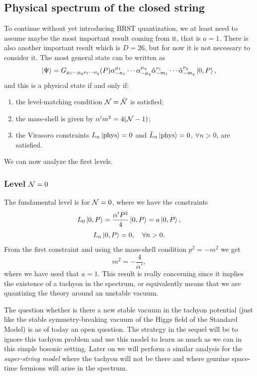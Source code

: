 \subsection{Physical spectrum of the closed string}
To continue without yet introducing BRST quantization, we at least need to assume maybe the most important result coming from it, that is $a = 1$. There is also another important result which is $D = 26$, but for now it is not necessary to consider it. The most general state can be written as 
\begin{equation}
    \ket{\Psi} = G_{\mu_1\cdots\mu_q\nu_1\cdots\nu_q}(P)\alpha^{\mu_1}_{-n_1}\cdots\alpha^{\mu_q}_{-\mu_q}\tilde{\alpha}^{\nu_1}_{-m_1}\cdots\tilde{\alpha}^{\nu_q}_{-m_q}\ket{0,P},
\end{equation}
and this is a physical state if and only if:
\begin{enumerate}
    \item the level-matching condition $\mathcal{N} = \tilde{\mathcal{N}}$ is satisfied;
    \item the mass-shell is given by $\alpha'm^2 = 4(\mathcal{N} - 1)$;
    \item the Virasoro constraints $L_n\ket{\mathrm{phys}} = 0$ and $\tilde{L}_n\ket{\mathrm{phys}} = 0$, $\forall n > 0$, are satisfied.
\end{enumerate}
We can now analyze the first levels. 

\subsubsection{Level \texorpdfstring{$\mathcal{N} = 0$}{N = 0}}
The fundamental level is for $\mathcal{N} = 0$, where we have the constraints 
\begin{equation}
    L_0\ket{0,P} = \frac{\alpha'P^2}{4}\ket{0,P} = a\ket{0,P},
\end{equation}
\begin{equation}
    L_n\ket{0,P} = 0,\quad \forall n > 0.
\end{equation}
From the first constraint and using the mass-shell condition $p^2 = -m^2$ we get 
\begin{equation}
    m^2 = -\frac{4}{\alpha'},
\end{equation}
where we have used that $a = 1$. This result is really concerning since it implies the existence of a tachyon in the spectrum, or equivalently means that we are quantizing the theory around an unstable vacuum.
\begin{obs}
    The question whether is there a new stable vacuum in the tachyon potential (just like the stable symmetry-breaking vacuum of the Higgs field of the Standard Model) is as of today an open question. The strategy in the sequel will be to ignore this tachyon problem and use this model to learn as much as we can in this simple bosonic setting. Later on we will perform a similar analysis for the \emph{super-string model} where the tachyon will not be there and where genuine space-time fermions will arise in the spectrum.
\end{obs}

